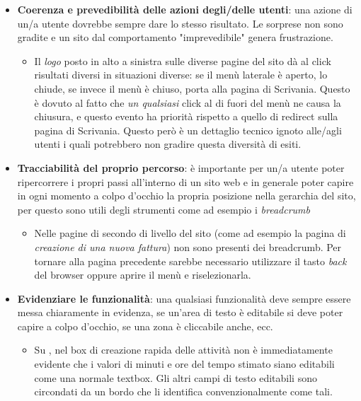 \begin{itemize}
\begin{itemize}
	\end{itemize}
\item \textbf{Coerenza e prevedibilità delle azioni degli/delle utenti}: una azione di un/a
utente dovrebbe sempre dare lo stesso risultato. Le sorprese non sono gradite e un sito
dal comportamento "imprevedibile" genera frustrazione.
	\begin{itemize}
	\item Il \textit{logo} posto in alto a sinistra sulle diverse pagine del sito dà al click
	risultati diversi in situazioni diverse: se il menù laterale è aperto, lo chiude, se invece
	il menù è chiuso, porta alla pagina di Scrivania. Questo è dovuto al fatto che
	\textit{un qualsiasi} click al di fuori del menù ne causa la chiusura, e questo evento ha
	priorità rispetto a quello di redirect sulla pagina di Scrivania. Questo però è un dettaglio
	tecnico ignoto alle/agli utenti i quali potrebbero non gradire questa diversità di esiti.
	\end{itemize}
\item \textbf{Tracciabilità del proprio percorso}: è importante per un/a utente poter
ripercorrere i propri passi all'interno di un sito web e in generale poter capire in ogni
momento a colpo d'occhio la propria posizione nella gerarchia del sito, per questo sono
utili degli strumenti come ad esempio i \textit{breadcrumb}
	\begin{itemize}
	\item Nelle pagine di secondo di livello del sito (come ad esempio la pagina di
	\textit{creazione di una nuova fattura}) non sono presenti dei breadcrumb. Per tornare alla
	pagina precedente sarebbe necessario utilizzare il tasto \textit{back} del browser oppure
	aprire il menù e riselezionarla.
	\end{itemize}
\item \textbf{Evidenziare le funzionalità}: una qualsiasi funzionalità deve sempre essere
messa chiaramente in evidenza, se un'area di testo è editabile si deve poter capire a colpo
d'occhio, se una zona è cliccabile anche, ecc.
	\begin{itemize}
	\item Su \textit{\resa{}}, nel box di creazione rapida delle attività non è immediatamente
	evidente che i valori di minuti e ore del tempo stimato siano editabili come una normale
	textbox. Gli altri campi di testo editabili sono circondati da un bordo che li identifica
	convenzionalmente come tali.
	

\end{itemize}
\end{itemize}
